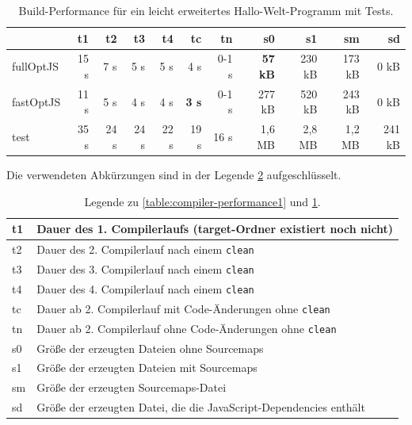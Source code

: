 \documentclass[a4paper, 12pt, hidelinks, listof=totoc, listoftables=totoc, bibliography=totoc]{scrreprt}
\newcommand{\code}[1]{\lstinline[language=Scala, style=inline]|#1|}
\begin{document}
\begin{table}[!h]
\begin{tabular}{|l|r|r|r|r|r|r||r|r|r|r|}
\hline           & t1   & t2   & t3   & t4   & tc            & tn    & s0             & s1     & sm     & sd     \\ 
\hline fullOptJS & 15 s &  7 s &  5 s &  5 s &          4 s  & 0-1 s & \textbf{57 kB} & 230 kB & 173 kB &   0 kB \\ 
\hline fastOptJS & 11 s &  5 s &  4 s &  4 s &  \textbf{3 s} & 0-1 s &        277 kB  & 520 kB & 243 kB &   0 kB \\ 
\hline test      & 35 s & 24 s & 24 s & 22 s &         19 s  &  16 s &        1,6 MB  & 2,8 MB & 1,2 MB & 241 kB \\ 
\hline 
\end{tabular} 
\caption{Build-Performance für ein leicht erweitertes Hallo-Welt-Programm mit Tests.}
\label{table:compiler-performance2}
\end{table}

\medskip

Die verwendeten Abkürzungen sind in der Legende \ref{table:compiler-performance-legend} aufgeschlüsselt.

\medskip

\begin{table}[!h]
\begin{tabular}{|l|l|}
\hline t1 & Dauer des 1. Compilerlaufs (target-Ordner existiert noch nicht) \\ 
\hline t2 & Dauer des 2. Compilerlauf nach einem \code{clean} \\ 
\hline t3 & Dauer des 3. Compilerlauf nach einem \code{clean} \\ 
\hline t4 & Dauer des 4. Compilerlauf nach einem \code{clean} \\ 
\hline tc & Dauer ab 2. Compilerlauf mit Code-Änderungen ohne \code{clean} \\ 
\hline tn & Dauer ab 2. Compilerlauf ohne Code-Änderungen ohne \code{clean} \\ 
\hline s0 & Größe der erzeugten Dateien ohne Sourcemaps \\ 
\hline s1 & Größe der erzeugten Dateien mit Sourcemaps \\ 
\hline sm & Größe der erzeugten Sourcemaps-Datei \\ 
\hline sd & Größe der erzeugten Datei, die die JavaScript-Dependencies enthält \\ 
\hline 
\end{tabular} 
\caption{Legende zu \ref{table:compiler-performance1} und \ref{table:compiler-performance2}.}
\label{table:compiler-performance-legend}
\end{table}
\end{document}
